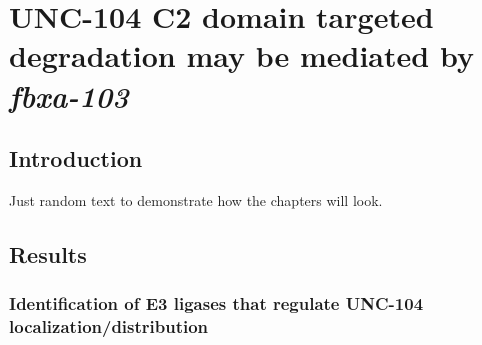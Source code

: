 
\chapter{UNC-104 C2 domain targeted degradation may be mediated by\- {\itshape fbxa-103}}

\section{Introduction}

Just random text to demonstrate how the chapters will look.
\blindtext {}


\section{Results}


\blindtext 


\subsection{Identification of E3 ligases that regulate UNC-104 localization/distribution}

\blindtext {}


%


